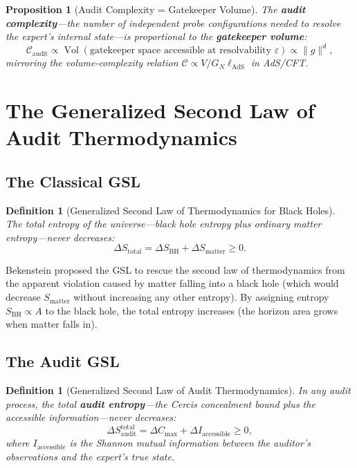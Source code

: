 \documentclass[12pt,a4paper]{article}
\newtheorem{proposition}[theorem]{Proposition}
\newtheorem{definition}[theorem]{Definition}
\theoremstyle{remark}
\newcommand{\Cercis}{\textsf{Cercis}}
\DeclareMathOperator{\Vol}{Vol}
\begin{document}
\begin{proposition}[Audit Complexity = Gatekeeper Volume]
\label{prop:audit_complexity}
The \textbf{audit complexity}---the number of independent probe configurations needed to resolve the expert's internal state---is proportional to the \textbf{gatekeeper volume}:
\begin{equation}
  \mathcal{C}_{\text{audit}} \propto \Vol(\text{gatekeeper space accessible at resolvability } \varepsilon) \propto \|g\|^d,
\end{equation}
mirroring the volume-complexity relation $\mathcal{C} \propto V / G_N \ell_{\text{AdS}}$ in AdS/CFT.
\end{proposition}


\section{The Generalized Second Law of Audit Thermodynamics}
\label{sec:gsl}

\subsection{The Classical GSL}

\begin{definition}[Generalized Second Law of Thermodynamics for Black Holes]
\label{def:gsl}
The total entropy of the universe---black hole entropy plus ordinary matter entropy---never decreases:
\begin{equation}
  \label{eq:gsl}
  \Delta S_{\text{total}} = \Delta S_{\text{BH}} + \Delta S_{\text{matter}} \geq 0.
\end{equation}
\end{definition}

Bekenstein proposed the GSL to rescue the second law of thermodynamics from the apparent violation caused by matter falling into a black hole (which would decrease $S_{\text{matter}}$ without increasing any other entropy). By assigning entropy $S_{\text{BH}} \propto A$ to the black hole, the total entropy increases (the horizon area grows when matter falls in).

\subsection{The Audit GSL}

\begin{definition}[Generalized Second Law of Audit Thermodynamics]
\label{def:audit_gsl}
In any audit process, the total \textbf{audit entropy}---the \Cercis{} concealment bound plus the accessible information---never decreases:
\begin{equation}
  \label{eq:audit_gsl}
  \Delta S_{\text{audit}}^{\text{total}} = \Delta C_{\max} + \Delta I_{\text{accessible}} \geq 0,
\end{equation}
where $I_{\text{accessible}}$ is the Shannon mutual information between the auditor's observations and the expert's true state.
\end{definition}
\end{document}
